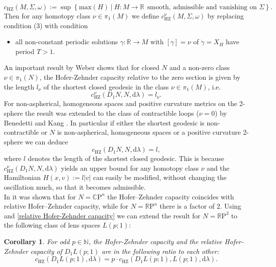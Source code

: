 \documentclass[12pt]{article}
\newtheorem{Corollary}[Definition]{Corollary}
\newcommand{\cp}{\mathbb{C}\mathrm{P}}
\newcommand{\rp}{\mathbb{R}\mathrm{P}}
\newcommand{\R}{\mathbb{R}} %
\newcommand{\N}{\mathbb{N}} %
\newcommand{\hz}{\mathrm{HZ}}
\newcommand{\dd}{\mathrm{d}}
\begin{document}
$$
c_{\hz}(M,\Sigma,\omega):=\sup\left\lbrace \mathrm{max}(H)\ \vert\ H: M\to \R\ \  \text{smooth, admissible and vanishing on }\Sigma\right\rbrace.
$$
Then for any homotopy class $\nu\in \pi_1(M)$ we define $c_{\hz}^\nu(M,\Sigma,\omega)$ by replacing condition (3) with condition
\begin{itemize}
    \item[(3)'] all non-constant periodic solutions $\gamma:\R \to M$ with $[\gamma]=\nu$ of $\dot \gamma=X_H$ have period $T>1$.
\end{itemize}
\noindent
An important result by Weber \cite{Wbr06} shows that for closed $N$ and a non-zero class $\nu\in\pi_1(N)$, the Hofer-Zehnder capacity relative to the zero section is given by the length $l_\nu$ of the shortest closed geodesic in the class $\nu\in\pi_1(M)$, i.e.
\begin{equation*}
    c_{\hz}^\nu(D_1N,N,\dd\lambda)=l_\nu.
\end{equation*}
For non-aspherical, homogeneous spaces and positive curvature metrics on the 2-sphere the result was extended to the class of contractible loops ($\nu=0$) by Benedetti and Kang \cite[Cor.\ 2.8]{BK22}. In particular if either the shortest geodesic is non-contractible or $N$ is non-aspherical, homogeneous spaces or a positive curvature 2-sphere we can deduce
\begin{equation}\label{relative Hofer-Zehnder capacity}
c_{\hz}(D_1N,N,\dd\lambda)=l,
\end{equation}
where $l$ denotes the length of the shortest closed geodesic. This is because $c_{\hz}^\nu(D_1N,N,\dd\lambda)$ yields an upper bound for any homotopy class $\nu$ and the Hamiltonian $H(x,v):=l\vert v\vert$ can easily be modified, without changing the oscillation much, so that it becomes admissible.\\
\noindent
In \cite{B23} it was shown that for $N=\cp^n$ the Hofer--Zehnder capacity coincides with relative Hofer--Zehnder capacity, while for $N=\rp^n$ there is a factor of 2. Using  and \eqref{relative Hofer-Zehnder capacity} we can extend the result for $N=\rp^3$ to the following class of lens spaces $L(p;1)$:
\begin{Corollary}\label{relative Hofer Zehnder Disk bundle lens space} For odd $p\in\N$, the Hofer-Zehnder capacity and the relative Hofer-Zehnder capacity of $D_1L(p;1)$ are in the following ratio to each other: 
    \begin{equation*}
        c_{\hz}(D_1L(p;1),\dd\lambda)=p\cdot c_{\hz}(D_1L(p;1),L(p;1),\dd\lambda).
    \end{equation*}
\end{Corollary}
\end{document}
